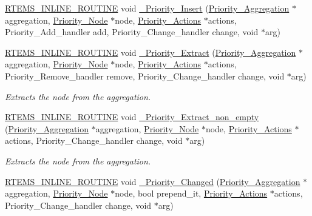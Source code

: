 \begin{DoxyCompactItemize}
\mbox{\hyperlink{group__RTEMSScoreBaseDefs_gac216239df231d5dbd15e3520b0b9313f}{R\+T\+E\+M\+S\+\_\+\+I\+N\+L\+I\+N\+E\+\_\+\+R\+O\+U\+T\+I\+NE}} void \mbox{\hyperlink{group__RTEMSScorePriority_gad7a0e6788cb685ddd6dc8b884f4b797a}{\+\_\+\+Priority\+\_\+\+Insert}} (\mbox{\hyperlink{structPriority__Aggregation}{Priority\+\_\+\+Aggregation}} $\ast$aggregation, \mbox{\hyperlink{structPriority__Node}{Priority\+\_\+\+Node}} $\ast$node, \mbox{\hyperlink{structPriority__Actions}{Priority\+\_\+\+Actions}} $\ast$actions, Priority\+\_\+\+Add\+\_\+handler add, Priority\+\_\+\+Change\+\_\+handler change, void $\ast$arg)
\item 
\mbox{\hyperlink{group__RTEMSScoreBaseDefs_gac216239df231d5dbd15e3520b0b9313f}{R\+T\+E\+M\+S\+\_\+\+I\+N\+L\+I\+N\+E\+\_\+\+R\+O\+U\+T\+I\+NE}} void \mbox{\hyperlink{group__RTEMSScorePriority_ga4a779aca3d3f5d714c7468398c30399d}{\+\_\+\+Priority\+\_\+\+Extract}} (\mbox{\hyperlink{structPriority__Aggregation}{Priority\+\_\+\+Aggregation}} $\ast$aggregation, \mbox{\hyperlink{structPriority__Node}{Priority\+\_\+\+Node}} $\ast$node, \mbox{\hyperlink{structPriority__Actions}{Priority\+\_\+\+Actions}} $\ast$actions, Priority\+\_\+\+Remove\+\_\+handler remove, Priority\+\_\+\+Change\+\_\+handler change, void $\ast$arg)
\begin{DoxyCompactList}\small\item\em Extracts the node from the aggregation. \end{DoxyCompactList}\item 
\mbox{\hyperlink{group__RTEMSScoreBaseDefs_gac216239df231d5dbd15e3520b0b9313f}{R\+T\+E\+M\+S\+\_\+\+I\+N\+L\+I\+N\+E\+\_\+\+R\+O\+U\+T\+I\+NE}} void \mbox{\hyperlink{group__RTEMSScorePriority_ga8628c09ae0aafba6264881d74cf3bcc6}{\+\_\+\+Priority\+\_\+\+Extract\+\_\+non\+\_\+empty}} (\mbox{\hyperlink{structPriority__Aggregation}{Priority\+\_\+\+Aggregation}} $\ast$aggregation, \mbox{\hyperlink{structPriority__Node}{Priority\+\_\+\+Node}} $\ast$node, \mbox{\hyperlink{structPriority__Actions}{Priority\+\_\+\+Actions}} $\ast$actions, Priority\+\_\+\+Change\+\_\+handler change, void $\ast$arg)
\begin{DoxyCompactList}\small\item\em Extracts the node from the aggregation. \end{DoxyCompactList}\item 
\mbox{\hyperlink{group__RTEMSScoreBaseDefs_gac216239df231d5dbd15e3520b0b9313f}{R\+T\+E\+M\+S\+\_\+\+I\+N\+L\+I\+N\+E\+\_\+\+R\+O\+U\+T\+I\+NE}} void \mbox{\hyperlink{group__RTEMSScorePriority_gaf09a0d40270cffbc84c45ca0655d2d78}{\+\_\+\+Priority\+\_\+\+Changed}} (\mbox{\hyperlink{structPriority__Aggregation}{Priority\+\_\+\+Aggregation}} $\ast$aggregation, \mbox{\hyperlink{structPriority__Node}{Priority\+\_\+\+Node}} $\ast$node, bool prepend\+\_\+it, \mbox{\hyperlink{structPriority__Actions}{Priority\+\_\+\+Actions}} $\ast$actions, Priority\+\_\+\+Change\+\_\+handler change, void $\ast$arg)

\end{DoxyCompactItemize}
